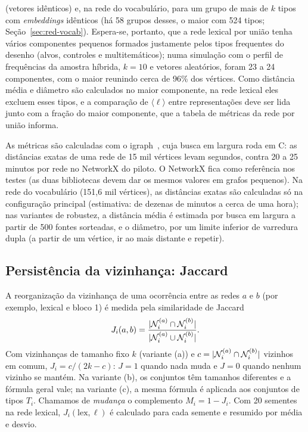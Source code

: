 \begin{description}
    (vetores idênticos) e, na rede do vocabulário, para um grupo de mais de $k$ tipos com
    \emph{embeddings} idênticos (há 58 grupos desses, o maior com 524 tipos;
    Seção~\ref{sec:red-vocab}). Espera-se, portanto, que a rede lexical por união tenha vários
    componentes pequenos formados justamente pelos tipos frequentes do desenho (alvos,
    controles e multitemáticos); numa simulação com o perfil de frequências da amostra híbrida,
    $k=10$ e vetores aleatórios, foram 23 a 24 componentes, com o maior reunindo cerca de 96\%
    dos vértices. Como distância média e diâmetro são calculados no maior componente, na rede
    lexical eles excluem esses tipos, e a comparação de $\langle\ell\rangle$ entre
    representações deve ser lida junto com a fração do maior componente, que a tabela de
    métricas da rede por união informa.
\end{description}

As métricas são calculadas com o igraph~\cite{csardi2006}, cuja busca em largura roda em C:
as distâncias exatas de uma rede de 15 mil vértices levam segundos, contra 20 a 25 minutos por
rede no NetworkX do piloto. O NetworkX fica como referência nos testes (as duas bibliotecas
devem dar os mesmos valores em grafos pequenos). Na rede do vocabulário (151,6 mil vértices),
as distâncias exatas são calculadas só na configuração principal (estimativa: de dezenas de
minutos a cerca de uma hora); nas variantes de robustez, a distância média é estimada por busca
em largura a partir de 500 fontes sorteadas, e o diâmetro, por um limite inferior de varredura
dupla (a partir de um vértice, ir ao mais distante e repetir).

\subsection{Persistência da vizinhança: Jaccard}\label{sec:met-jaccard}

A reorganização da vizinhança de uma ocorrência entre as redes $a$ e $b$ (por exemplo, lexical
e bloco 1) é medida pela similaridade de Jaccard
\begin{equation}
    J_i(a,b)=\frac{|\mathcal{N}_i^{(a)}\cap\mathcal{N}_i^{(b)}|}{|\mathcal{N}_i^{(a)}\cup\mathcal{N}_i^{(b)}|}.
\end{equation}
Com vizinhanças de tamanho fixo $k$ (variante (a)) e $c=|\mathcal{N}_i^{(a)}\cap\mathcal{N}_i^{(b)}|$ vizinhos em
comum, $J_i=c/(2k-c)$: $J=1$ quando nada muda e $J=0$ quando nenhum vizinho se mantém. Na
variante (b), os conjuntos têm tamanhos diferentes e a fórmula geral vale; na variante (c), a
mesma fórmula é aplicada aos conjuntos de tipos $T_i$. Chamamos de \emph{mudança} o complemento
$M_i=1-J_i$. Com 20 sementes na rede lexical, $J_i(\mathrm{lex},\ell)$ é calculado para cada
semente e resumido por média e desvio.

